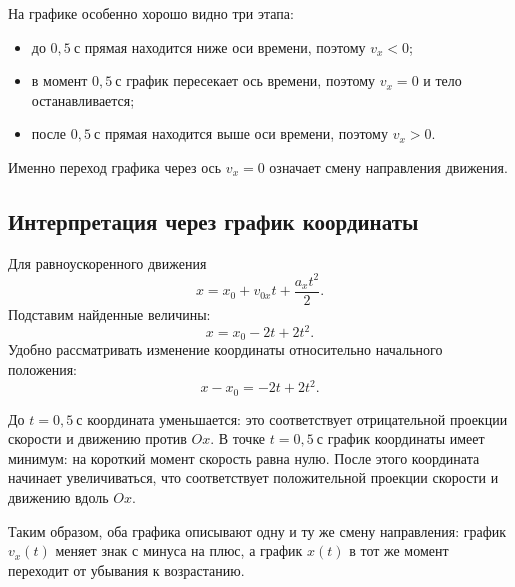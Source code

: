 \documentclass[12pt,a4paper]{article}
\begin{document}
На графике особенно хорошо видно три этапа:
\begin{itemize}
  \item до $0{,}5\ \text{с}$ прямая находится ниже оси времени, поэтому $v_x<0$;
  \item в момент $0{,}5\ \text{с}$ график пересекает ось времени, поэтому $v_x=0$ и тело останавливается;
  \item после $0{,}5\ \text{с}$ прямая находится выше оси времени, поэтому $v_x>0$.
\end{itemize}

Именно переход графика через ось $v_x=0$ означает смену направления движения.

\subsection*{Интерпретация через график координаты}
Для равноускоренного движения
\[
x=x_0+v_{0x}t+\frac{a_xt^2}{2}.
\]
Подставим найденные величины:
\[
x=x_0-2t+2t^2.
\]
Удобно рассматривать изменение координаты относительно начального положения:
\[
x-x_0=-2t+2t^2.
\]

\begin{center}
\end{center}

До $t=0{,}5\ \text{с}$ координата уменьшается: это соответствует отрицательной проекции скорости и движению против $Ox$. В точке $t=0{,}5\ \text{с}$ график координаты имеет минимум: на короткий момент скорость равна нулю. После этого координата начинает увеличиваться, что соответствует положительной проекции скорости и движению вдоль $Ox$.

Таким образом, оба графика описывают одну и ту же смену направления: график $v_x(t)$ меняет знак с минуса на плюс, а график $x(t)$ в тот же момент переходит от убывания к возрастанию.
\end{document}
